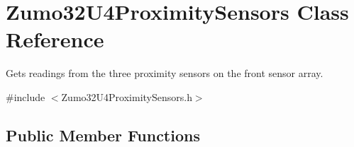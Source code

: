 \hypertarget{class_zumo32_u4_proximity_sensors}{}\section{Zumo32\+U4\+Proximity\+Sensors Class Reference}
\label{class_zumo32_u4_proximity_sensors}


Gets readings from the three proximity sensors on the front sensor array.  




{\ttfamily \#include $<$Zumo32\+U4\+Proximity\+Sensors.\+h$>$}

\subsection*{Public Member Functions}
